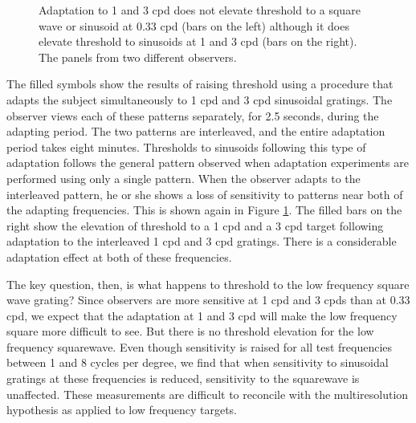 \begin{figure}
\centerline{
}
\caption[Adaptation to Low Frequency Mixtures]{
Adaptation to 1 and 3 cpd does not elevate threshold
to a square wave or sinusoid at 0.33 cpd (bars on the left)
although it does elevate threshold to sinusoids at
1 and 3 cpd (bars on the right).
The panels from two different observers.
}
\label{f6:GM.Fig4}
\end{figure}
The filled symbols show the results of raising threshold
using a procedure that adapts the subject
simultaneously to 1 cpd and 3 cpd sinusoidal gratings.
The observer views each of these patterns separately,
for 2.5 seconds, during the adapting period.
The two patterns are interleaved, and the entire
adaptation period takes eight minutes.
Thresholds to sinusoids following this type of adaptation
follows the general pattern observed
when adaptation experiments are performed
using only a single pattern.
When the observer adapts to the interleaved
pattern, he or she shows a loss of
sensitivity to patterns near both of the adapting
frequencies.
This is shown again in Figure \ref{f6:GM.Fig4}.
The filled bars on the right show the elevation of
threshold to a 1 cpd and a 3 cpd target
following adaptation to the interleaved 1 cpd and 3 cpd gratings.
There is a considerable adaptation effect at
both of these frequencies.

The key question, then, is what happens to threshold
to the low frequency square wave grating?
Since observers are more sensitive at 1 cpd and 3 cpds
than at 0.33 cpd, we expect that the adaptation at 1 and 3 cpd
will make the low frequency square more difficult to see.
But there is no threshold elevation for the low
frequency squarewave.
Even though sensitivity is raised for all test frequencies
between 1 and 8 cycles per degree,
we find that when sensitivity to sinusoidal gratings
at these frequencies is reduced, sensitivity to
the squarewave is unaffected.
These measurements are difficult to reconcile with
the multiresolution hypothesis as applied to low frequency
targets.

